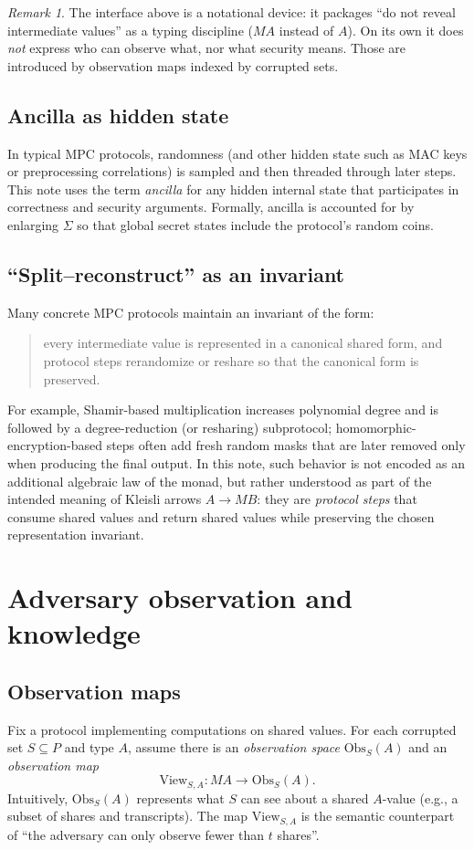 \documentclass[11pt,a4paper]{article}
\theoremstyle{definition}
\theoremstyle{remark}
\newtheorem{remark}[theorem]{Remark}
\newcommand{\Parties}{P}
\newcommand{\View}{\mathrm{View}}
\newcommand{\Obs}{\mathrm{Obs}}
\begin{document}
\begin{remark}
The interface above is a notational device: it packages ``do not reveal intermediate values'' as a typing discipline (\(M A\) instead of \(A\)). On its own it does \emph{not} express who can observe what, nor what security means. Those are introduced by observation maps indexed by corrupted sets.
\end{remark}

\subsection{Ancilla as hidden state}
In typical MPC protocols, randomness (and other hidden state such as MAC keys or preprocessing correlations) is sampled and then threaded through later steps. This note uses the term \emph{ancilla} for any hidden internal state that participates in correctness and security arguments. Formally, ancilla is accounted for by enlarging \(\Sigma\) so that global secret states include the protocol's random coins.

\subsection{``Split--reconstruct'' as an invariant}
Many concrete MPC protocols maintain an invariant of the form:
\begin{quote}
every intermediate value is represented in a canonical shared form, and protocol steps rerandomize or reshare so that the canonical form is preserved.
\end{quote}
For example, Shamir-based multiplication increases polynomial degree and is followed by a degree-reduction (or resharing) subprotocol; homomorphic-encryption-based steps often add fresh random masks that are later removed only when producing the final output. In this note, such behavior is not encoded as an additional algebraic law of the monad, but rather understood as part of the intended meaning of Kleisli arrows \(A\to M B\): they are \emph{protocol steps} that consume shared values and return shared values while preserving the chosen representation invariant.

\section{Adversary observation and knowledge}
\label{sec:observation-knowledge}

\subsection{Observation maps}
Fix a protocol implementing computations on shared values. For each corrupted set \(S\subseteq \Parties\) and type \(A\), assume there is an \emph{observation space} \(\Obs_S(A)\) and an \emph{observation map}
\begin{equation}
\label{eq:view-map}
  \View_{S,A} : M A \to \Obs_S(A).
\end{equation}
Intuitively, \(\Obs_S(A)\) represents what \(S\) can see about a shared \(A\)-value (e.g., a subset of shares and transcripts). The map \(\View_{S,A}\) is the semantic counterpart of ``the adversary can only observe fewer than \(t\) shares''.
\end{document}
